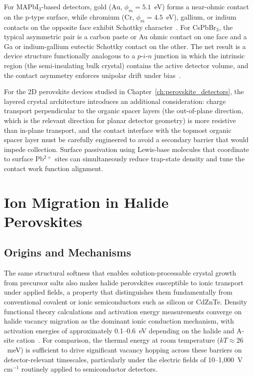 For MAPbI$_3$-based detectors, gold (Au, $\phi_m = 5.1$~eV) forms a
near-ohmic contact on the p-type surface, while chromium (Cr,
$\phi_m = 4.5$~eV), gallium, or indium contacts on the opposite face
exhibit Schottky character~\cite{Wei2016}.  For CsPbBr$_3$, the typical
asymmetric pair is a carbon paste or Au ohmic contact on one face and
a Ga or indium-gallium eutectic Schottky contact on the other.  The
net result is a device structure functionally analogous to a $p$-$i$-$n$
junction in which the intrinsic region (the semi-insulating bulk crystal)
contains the active detector volume, and the contact asymmetry enforces
unipolar drift under bias~\cite{He_NatPhoton_2021}.

For the 2D perovskite devices studied in Chapter~\ref{ch:perovskite_detectors},
the layered crystal architecture introduces an additional consideration:
charge transport perpendicular to the organic spacer layers (the
out-of-plane direction, which is the relevant direction for planar
detector geometry) is more resistive than in-plane transport, and the
contact interface with the topmost organic spacer layer must be carefully
engineered to avoid a secondary barrier that would impede collection.
Surface passivation using Lewis-base molecules that coordinate to
surface Pb$^{2+}$ sites can simultaneously reduce trap-state density
and tune the contact work function alignment.

\section{Ion Migration in Halide Perovskites}
\label{sec:ion_migration}

\subsection{Origins and Mechanisms}

The same structural softness that enables solution-processable
crystal growth from precursor salts also makes halide perovskites
susceptible to ionic transport under applied fields, a property that
distinguishes them fundamentally from conventional covalent or ionic
semiconductors such as silicon or CdZnTe.  Density functional theory
calculations and activation energy measurements converge on halide
vacancy migration as the dominant ionic conduction mechanism, with
activation energies of approximately 0.1--0.6~eV depending on the
halide and A-site cation~\cite{Eames2015}.  For comparison, the
thermal energy at room temperature ($kT \approx 26$~meV) is
sufficient to drive significant vacancy hopping across these barriers
on detector-relevant timescales, particularly under the electric fields
of 10--1,000~V\,cm$^{-1}$ routinely applied to semiconductor detectors.

